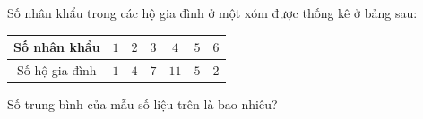 \begin{ex}
Số nhân khẩu trong các hộ gia đình ở một xóm được thống kê ở bảng sau:
\begin{center}
\begin{tabular}{|c|c|c|c|c|c|c|}\hline
Số nhân khẩu & $1$ & $2$ & $3$ & $4$ & $5$ & $6$\\\hline
Số hộ gia đình & $1$ & $4$ & $7$ & $11$ & $5$ & $2$\\\hline
\end{tabular}
\end{center}
Số trung bình của mẫu số liệu trên là bao nhiêu?
\end{ex}
